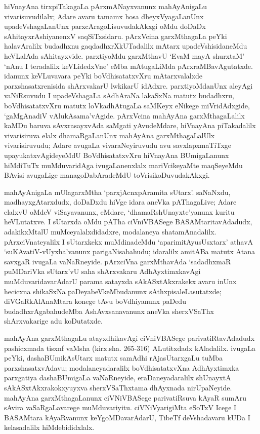 hiVnayAna tirxpiTakagaLa pArxmANayxvanunx mahAyAnigaLu vivarisuvudilalx; Adare avaru tamamx hosa dheyxVyagaLanUnx upadeVshagaLanUnx parxcAragoLisuvudakAkxgi oMdu doDaDx sAhitayxrAshiyanenxV saqSiTxsidaru. pArxVcina garxMthagaLa peYki halavAralilx  \hbox{budadhxnu} gaqdadhxrX\-kUTadalilx mAtarx upadeVshisidaneMdu heVLalAda sAhitayxvide. parxtiyoMdu garxMthavU `EvaM mayA shurxtaM' `nAnu I teradalilx keVLidedxVne' eMba mAtugaLiMda pArxraMBavAgutatxde. idanunx keVLuvavara peYki boVdhisatatxvXru mAtarxvalalxde parxshasatxrenisida shArxvakarU lwkikarU idAdxre. parxtiyoMdanUnx aleyAgi vaNiRsuvudu I upa\-deVshagaLa sAdhAraNa lakaSxNa matutx budadhxru, boVdhisatatxvXru matutx loVkadhAtugaLa saMKeyx eNikege miVridAdxgide, `gaMgAnadiV vAlukAsama'vAgide. pArxVcina mahAyAna garxMtha\-gaLalilx kaMDu baruva  sAvxrasayxvAda saMgati yAvudeMdare, hiVnayAna piTakadalilx vivarisiruva elalx dhamaRgaLanUnx mahAyAna garxMthagaLalUlx vivarisiruvudu; Adare avugaLa vivaraNeyiruvudu avu savxlapxmaTiTxge upayukatxvAgideyeMdU BoVdhi\-satatxvXru hiVnayAna BUmigaLanunx hiMdiTuTx muMduvaridAga ivugaLanenxlalx mariV\-cike\-yaMte maqSeyeMdu BAvisi avugaLige managoDabAradeMdU toVrisikoDuvu\-dakAkxgi.

mahAyAnigaLa mUlagarxMtha `parxjAcnxpAramita sUtarx'. saNaNxdu, madhayxgAtarxdudx, doDaDxdu hiVge idara aneVka pAThagaLive; Adare elalxvU oMdeV viSayavanunx, eMdare, `dhamaRshUnayxte'yanunx kuritu heVLutatxve. I sUtarxda oMdu pATha ciVniVBASege BASAMtaritavAdadudx, adakikxMtalU muMceyalalxdidadxre, modalaneya shatamAnadalilx. pArxciVnateyalilx I sUtarxkekx muMdinadeMdu `aparimitAyusUsxtarx' athavA `suKAvatiV-vUyxha'vanunx parigaNisabahudu; idaralilx amitABa matutx Atana savxgaR ivugaLa vaNaRneyide. pArxciVna garxMthavAda `sadadhxmaR puMDariVka sUtarx'vU saha shArxvakaru AdhAyxtimxkavAgi muMduvaridavarAdarU parama satayxda sAkASxtAkxrakekx avaru inUnx hecicxna shikaSxNa paDeyabeVkeMbudanunx sAthxpisaleLasutatxde; diVGaRkAlAnaMtara konege tAvu boVdhiyanunx paDedu budadhxrAgabahudeMba AshAvxsanavanunx aneVka sherxVSaThx shArxvakarige adu koDutatxde.

mahAyAna garxMthagaLu atayxdhikavAgi ciVniVBASege parivatiRtavAdadudx pashicxmada tisxnf vaMsha (kirx.sha. 265-316) ALutitxdadx kAladalilx. ivugaLa peYki, dashaBUmikA\-sUtarx matutx samAdhi rAjasUtarxgaLu tuMba parxshasatxvAdavu; modalaneyadaralilx boVdhisatatxvXna AdhAyxtimxka parxgatiya dashaBUmigaLa vaNaRneyide, eraDaneyadaralilx shUnayxtA sAkASxtAkxrakokxyuyxva sherxVSaThxtama dhAyxnada nirUpaNeyide. mahAyAna garxMthagaLanunx ciVNiVBASege parivatiRsuva kAyaR sumAru sAvira vaSaRgaLavarege muMduvariyitu. ciVNiVyarigiMta eSoTxV Icege I BASAMtara kAyaRvanunx keYgoMDavarAdarU, TibeTf deVshadavaru kUDa I kelasadalilx hiMdebididxlalx.

